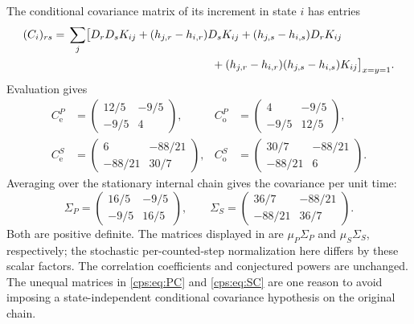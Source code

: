 \documentclass[11pt,letterpaper]{article}
\numberwithin{equation}{section}
\theoremstyle{remark}\newtheorem{remark}[theorem]{Remark}
\newcommand{\e}{\mathrm e}
\newcommand{\oState}{\mathrm o}
\begin{document}
The conditional covariance matrix of its increment in state $i$ has entries
\begin{align}\label{cps:eq:Cformula}
 (C_i)_{rs}={}&\sum_j\bigl[ D_rD_sK_{ij}
 +(h_{j,r}-h_{i,r})D_sK_{ij}
 +(h_{j,s}-h_{i,s})D_rK_{ij}\notag\\
 &\hspace{45mm}+(h_{j,r}-h_{i,r})(h_{j,s}-h_{i,s})K_{ij}\bigr]_{x=y=1}.
\end{align}
Evaluation gives
\begin{align}
 C^P_{\e}&=\begin{pmatrix}12/5&-9/5\\-9/5&4\end{pmatrix},&
 C^P_{\oState}&=\begin{pmatrix}4&-9/5\\-9/5&12/5\end{pmatrix},\label{cps:eq:PC}\\
 C^S_{\e}&=\begin{pmatrix}6&-88/21\\-88/21&30/7\end{pmatrix},&
 C^S_{\oState}&=\begin{pmatrix}30/7&-88/21\\-88/21&6\end{pmatrix}.\label{cps:eq:SC}
\end{align}
Averaging over the stationary internal chain gives the covariance per unit time:
\begin{equation}\label{cps:eq:Sigma}
 \Sigma_P=\begin{pmatrix}16/5&-9/5\\-9/5&16/5\end{pmatrix},\qquad
 \Sigma_S=\begin{pmatrix}36/7&-88/21\\-88/21&36/7\end{pmatrix}.
\end{equation}
Both are positive definite. The matrices displayed in \cite[Section 4.2]{FNS} are $\mu_P\Sigma_P$ and $\mu_S\Sigma_S$, respectively; the stochastic per-counted-step normalization here differs by these scalar factors. The correlation coefficients and conjectured powers are unchanged. The unequal matrices in \eqref{cps:eq:PC} and \eqref{cps:eq:SC} are one reason to avoid imposing a state-independent conditional covariance hypothesis on the original chain.
\end{document}

